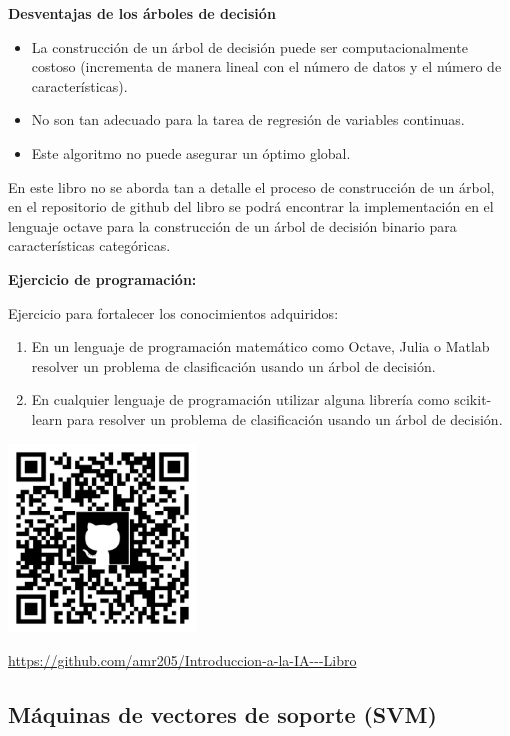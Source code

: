 \documentclass[11pt,fleqn]{book} %
\begin{document}
\textbf{Desventajas de los árboles de decisión}

\begin{itemize}
\item La construcción de un árbol de decisión puede ser computacionalmente costoso (incrementa de manera lineal con el número de datos y el número de características).
\item No son tan adecuado para la tarea de regresión de variables continuas.
\item Este algoritmo no puede asegurar un óptimo global.
\end{itemize}

En este libro no se aborda tan a detalle el proceso de construcción de un árbol, en el repositorio de github del libro se podrá encontrar la implementación en el lenguaje octave para la construcción de un árbol de decisión binario para características categóricas.

\clearpage

\textbf{Ejercicio de programación:}

Ejercicio para fortalecer los conocimientos adquiridos:

\begin{enumerate}
\item En un lenguaje de programación matemático como Octave, Julia o Matlab resolver un problema de clasificación usando un árbol de decisión.
\item En cualquier lenguaje de programación utilizar alguna librería como scikit-learn para resolver un problema de clasificación usando un árbol de decisión.
\end{enumerate}

\includegraphics[width=5cm]{Pictures/github/libro-ia.png}

\url{https://github.com/amr205/Introduccion-a-la-IA---Libro}

\subsection{Máquinas de vectores de soporte (SVM)} 
\end{document}
